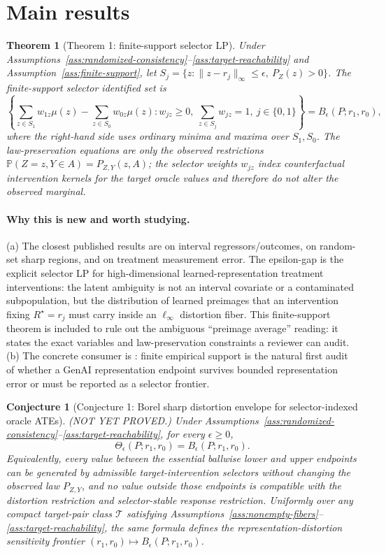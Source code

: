 \documentclass[11pt]{article}
\renewcommand{\Pr}{\mathbb{P}}
\theoremstyle{definition}
\theoremstyle{plain}
\newtheorem{theorem}{Theorem}
\newtheorem{conjecture}{Conjecture}
\theoremstyle{remark}
\begin{document}
\section{Main results}
\begin{theorem}[Theorem 1: finite-support selector LP]\label{thm:finite-support-lp}
Under Assumptions~\ref{ass:randomized-consistency}--\ref{ass:target-reachability} and Assumption~\ref{ass:finite-support}, let \(S_j=\{z:\|z-r_j\|_\infty\le\epsilon,\ P_Z(z)>0\}\).  The finite-support selector identified set is
\[
\left\{
\sum_{z\in S_1}w_{1z}\mu(z)-\sum_{z\in S_0}w_{0z}\mu(z):
w_{jz}\ge0,\ \sum_{z\in S_j}w_{jz}=1,\ j\in\{0,1\}
\right\}
=
B_\epsilon(P;r_1,r_0),
\]
where the right-hand side uses ordinary minima and maxima over \(S_1,S_0\).  The law-preservation equations are only the observed restrictions \(\Pr(Z=z,Y\in A)=P_{Z,Y}(z,A)\); the selector weights \(w_{jz}\) index counterfactual intervention kernels for the target oracle values and therefore do not alter the observed marginal.
\end{theorem}
\paragraph{Why this is new and worth studying.}
(a) The closest published results are \citet{ManskiTamer2002} on interval regressors/outcomes, \citet{BeresteanuMolchanovMolinari2011,BeresteanuMolchanovMolinari2012} on random-set sharp regions, and \citet{Ura2018} on treatment measurement error.  The epsilon-gap is the explicit selector LP for high-dimensional learned-representation treatment interventions: the latent ambiguity is not an interval covariate or a contaminated subpopulation, but the distribution of learned preimages that an intervention fixing \(R^\star=r_j\) must carry inside an \(\ell_\infty\) distortion fiber.  This finite-support theorem is included to rule out the ambiguous ``preimage average'' reading: it states the exact variables and law-preservation constraints a reviewer can audit.  (b) The concrete consumer is \citet{ImaiNakamura2024TextTreatments}: finite empirical support is the natural first audit of whether a GenAI representation endpoint survives bounded representation error or must be reported as a selector frontier.

\begin{conjecture}[Conjecture 1: Borel sharp distortion envelope for selector-indexed oracle ATEs]\label{conj:sharp-envelope}
(NOT YET PROVED.)  Under Assumptions~\ref{ass:randomized-consistency}--\ref{ass:target-reachability}, for every \(\epsilon\ge0\),
\[
\Theta_\epsilon(P;r_1,r_0)=B_\epsilon(P;r_1,r_0).
\]
Equivalently, every value between the essential ballwise lower and upper endpoints can be generated by admissible target-intervention selectors without changing the observed law \(P_{Z,Y}\), and no value outside those endpoints is compatible with the distortion restriction and selector-stable response restriction.  Uniformly over any compact target-pair class \(\mathcal T\) satisfying Assumptions~\ref{ass:nonempty-fibers}--\ref{ass:target-reachability}, the same formula defines the representation-distortion sensitivity frontier \((r_1,r_0)\mapsto B_\epsilon(P;r_1,r_0)\).
\end{conjecture}
\end{document}
